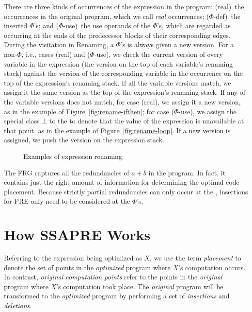 There are three kinds of occurrences of the expression in the program: 
(real)~the occurrences in the original program, which we call \emph{real} occurrences; 
($\Phi$-def)~the inserted $\Phi$'s; 
and ($\Phi$-use)~the use operands of the $\Phi$'s, which are regarded as occurring at the ends of the predecessor blocks of their corresponding edges. 
During the visitation in Renaming, a $\Phi$'s is always given a new version. 
For a non-$\Phi$, i.e., cases (real) and ($\Phi$-use), we check the current version of every variable in the expression (the version on the top of each variable's renaming stack) against the version of the corresponding variable in the occurrence on the top of the expression's renaming stack. 
If all the variable versions match, we assign it the same version as the top of the expression's renaming stack. 
If any of the variable versions does not match, for case (real), we assign it a new version, as in the example of Figure~\ref{fig:rename-ifthen}; 
for case ($\Phi$-use), we assign the special class $\bot$ to the \PHIuse to denote that the value of the expression is unavailable at that point, as in the example of Figure~\ref{fig:rename-loop}. 
If a new version is assigned, we push the version on the expression stack.

\begin{figure}
\centering
\caption{Examples of expression renaming}
\label{fig:rename}
\end{figure}
  
The FRG captures all the redundancies of $a+b$ in the program. 
In fact, it contains just the right amount of information for determining the optimal code placement. 
Because strictly partial redundancies can only occur at the \PHInodes, insertions for PRE only need to be considered at the $\Phi$'s.

\section{How SSAPRE Works}
\label{section:Part3:Pre_not_helped:SSAPRE}

Referring to the expression being optimized as $X$, we use the term \emph{placement} to denote the set of points in the \emph{optimized} program where $X$'s computation occurs. 
In contrast, \emph{original computation points} refer to the points in the \emph{original} program where $X$'s computation took place. 
The \emph{original} program will be transformed to the \emph{optimized} program by performing a set of \emph{insertions} and \emph{deletions}.

